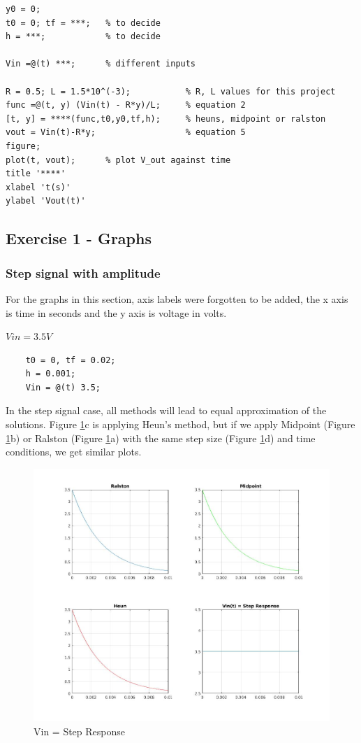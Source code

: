 \documentclass[11pt,a4paper]{article}
\begin{document}
\begin{verbatim}
y0 = 0;
t0 = 0; tf = ***;   % to decide
h = ***;            % to decide

Vin =@(t) ***;      % different inputs

R = 0.5; L = 1.5*10^(-3);           % R, L values for this project
func =@(t, y) (Vin(t) - R*y)/L;     % equation 2
[t, y] = ****(func,t0,y0,tf,h);     % heuns, midpoint or ralston
vout = Vin(t)-R*y;                  % equation 5
figure;
plot(t, vout);      % plot V_out against time
title '****'
xlabel 't(s)'
ylabel 'Vout(t)'

\end{verbatim}
\newpage

\subsection{Exercise 1 - Graphs}
\subsubsection{Step signal with amplitude}

For the graphs in this section, axis labels were forgotten to be added, the x axis is time in seconds and the y axis is voltage in volts.

	$Vin = 3.5V$

\begin{verbatim}
	t0 = 0, tf = 0.02;
	h = 0.001;
	Vin = @(t) 3.5;
\end{verbatim}

In the step signal case, all methods will lead to equal approximation of the solutions. Figure \ref{fig:RL2}c is applying Heun's method, but if we apply Midpoint (Figure \ref{fig:RL2}b) or Ralston (Figure \ref{fig:RL2}a) with the same step size (Figure \ref{fig:RL2}d) and time conditions, we get similar plots.

\begin{figure}[h]
	\includegraphics[width=\textwidth]{Ex1_Figs/substep.jpg}
	\vspace{-6mm}
	\caption{Vin = Step Response}
	\label{fig:RL2}
\end{figure}
\end{document}

